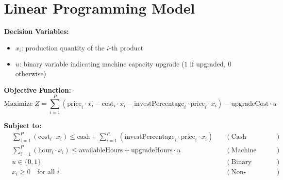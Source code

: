 \documentclass{article}
\begin{document}
\section*{Linear Programming Model}

\textbf{Decision Variables:}
\begin{itemize}
    \item $x_i$: production quantity of the $i$-th product
    \item $u$: binary variable indicating machine capacity upgrade ($1$ if upgraded, $0$ otherwise)
\end{itemize}

\textbf{Objective Function:}
\[
\text{Maximize } Z = \sum_{i=1}^{P} \left(\text{price}_i \cdot x_i - \text{cost}_i \cdot x_i - \text{investPercentage}_i \cdot \text{price}_i \cdot x_i\right) - \text{upgradeCost} \cdot u
\]

\textbf{Subject to:}
\begin{align*}
    & \sum_{i=1}^{P} \left(\text{cost}_i \cdot x_i\right) \leq \text{cash} + \sum_{i=1}^{P} \left(\text{investPercentage}_i \cdot \text{price}_i \cdot x_i\right) \quad & (\text{Cash Constraint}) \\
    & \sum_{i=1}^{P} \left(\text{hour}_i \cdot x_i\right) \leq \text{availableHours} + \text{upgradeHours} \cdot u \quad & (\text{Machine Hours Constraint}) \\
    & u \in \{0, 1\} \quad & (\text{Binary Upgrade Variable}) \\
    & x_i \geq 0 \quad \text{for all } i \quad & (\text{Non-negativity Constraint})
\end{align*}
\end{document}
